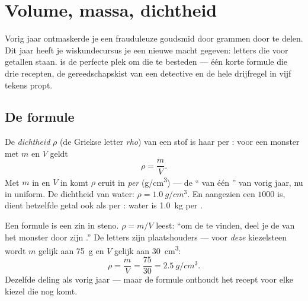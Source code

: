 \chapter{Volume, massa, dichtheid}\label{ch:g7:volume-mass-density}

Vorig jaar ontmaskerde je een frauduleuze goudsmid door grammen door
 te delen. Dit jaar heeft je wiskundecursus je een
nieuwe macht gegeven: letters die voor getallen staan.
 is de perfecte plek om die te besteden --- één korte
formule die drie recepten, de gereedschapskist van een detective en de
hele drijfregel in vijf tekens propt.

\section{De formule}

\begin{definition}\label{def:g7:volume-mass-density:formula}
De \emph{dichtheid} $\rho$ (de Griekse letter
\emph{rho}) van een stof is haar  per 
: voor een monster met  $m$ en  $V$ geldt
\[
\rho = \frac{m}{V}.
\]
Met $m$ in  en $V$ in  komt $\rho$ eruit in
\emph{ per } (\unit{g/cm^3}) --- de
`` van één '' van vorig jaar, nu in
uniform. De dichtheid van water: $\rho = \qty{1.0}{g/cm^3}$. En
aangezien een  $1000$  is, dient hetzelfde
getal ook als  per : water is \qty{1.0}{kg} per
.
\end{definition}

\begin{example}\label{ex:g7:volume-mass-density:reading}
Een formule is een zin in steno. $\rho = m/V$ leest: ``om de
 te vinden, deel je de  van het monster door zijn
.'' De letters zijn plaatshouders --- voor \emph{deze}
kiezelsteen wordt $m$ gelijk aan \qty{75}{g} en $V$ gelijk aan
\qty{30}{cm^3}:
\[
\rho = \frac{m}{V} = \frac{75}{30} = \qty{2.5}{g/cm^3}.
\]
Dezelfde deling als vorig jaar --- maar de formule onthoudt het recept
voor elke kiezel die nog komt.
\end{example}

